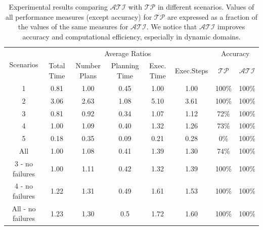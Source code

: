 \documentclass[letterpaper, 10 pt, conference]{article}  %
\begin{document}
\begin{table}[t]
\centering
\small
\setlength\arrayrulewidth{0.5pt}
\begin{tabular}{|c|c|c|c|c|c|c|c|}
 \hline
\multirow{2}{*}{Scenarios}&  \multicolumn{5}{|c|}{Average Ratios} & \multicolumn{2}{|c|}{Accuracy}\\
 \cline{2-8}
&Total Time &Number Plans &Planning Time &Exec. Time &Exec.Steps & $\mathcal{TP}$ & $\mathcal{ATI}$ \\
\hline
 1 &0.81 &1.00 &0.45  &1.00 &1.00 &100\% &100\% \\
 \hline
 2 &3.06 &2.63 &1.08 &5.10 &3.61 &100\% &100\% \\
 \hline
3 &0.81 &0.92 &0.34 &1.07 &1.12 &72\% &100\% \\
 \hline
4 &1.00 &1.09 &0.40 &1.32 &1.26 &73\% &100\% \\
 \hline
5 &0.18 &0.35 &0.09 &0.21 &0.28 &0\%   &100\% \\
 \hline
 All &1.00 & 1.08 &0.41 &1.39 &1.30 &74\% &100\% \\
 \hline
 3 - no failures &1.00 &1.11 &0.42 &1.32 &1.39 &100\% &100\% \\
 \hline
 4 - no failures  &1.22 &1.31 &0.49 &1.61 &1.53 &100\% &100\% \\
 \hline
 All - no failures &1.23&1.30 &0.5 &1.72 &1.60 &100\% &100\% \\
\hline
\end{tabular}
\caption[Results]{Experimental results comparing $\mathcal{ATI}$ with $\mathcal{TP}$ in different scenarios. Values of all performance measures (except accuracy) for $\mathcal{TP}$ are expressed as a fraction of the values of the same measures for $\mathcal{ATI}$. We notice that $\mathcal{ATI}$ improves accuracy and computational efficiency, especially in dynamic domains.}
\label{tab:sim-results}
\end{table}

\end{document}
